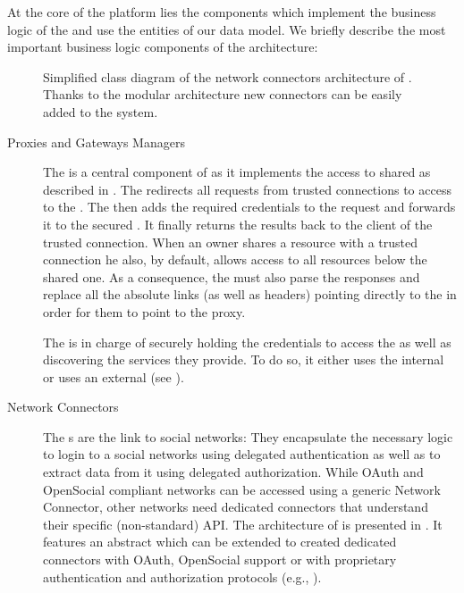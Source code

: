 At the core of the platform lies the components which implement the business logic of the \sac{} and use the entities of our data model. We briefly describe the most important business logic components of the \sac{} architecture:

\begin{figure}
\caption{Simplified class diagram of the network connectors architecture of \sac{}. Thanks to the modular architecture new connectors can be easily added to the system.}
\label{fig:sac-network-connectors}
\end{figure}
\begin{description}
  \item[Proxies and Gateways Managers] The  is a central component of \sac{} as it implements the access to shared \sts{} as described in . The  redirects all requests from trusted connections to access \sts{} to the . The  then adds the required credentials to the request and forwards it to the secured \sts{}. It finally returns the results back to the client of the trusted connection. When an owner shares a resource with a trusted connection he also, by default, allows access to all resources below the shared one. As a consequence, the  must also parse the responses and replace all the absolute links (as well as  headers) pointing directly to the \sts{} in order for them to point to the \sts{} proxy.

  The  is in charge of securely holding the credentials to access the \sts{} as well as discovering the services they provide. To do so, it either uses the internal  or uses an external \transService{} (see ). 
  
  \item[Network Connectors] The s are the \sac{} link to social networks: They encapsulate the necessary logic to login to a social networks using delegated authentication as well as to extract data from it using delegated authorization. While OAuth and OpenSocial compliant networks can be accessed using a generic Network Connector, other networks need dedicated connectors that understand their specific (non-standard) API. The  architecture of \sac{} is presented in . It features an abstract  which can be extended to created dedicated connectors with OAuth, OpenSocial support or with proprietary authentication and authorization protocols (e.g., ).
 

\end{description}
